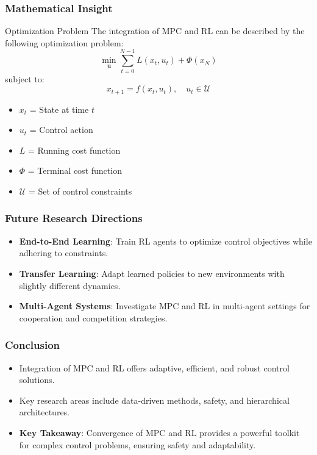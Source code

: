 \documentclass[aspectratio=169]{beamer}
\begin{document}
\begin{frame}[fragile]
    \frametitle{Mathematical Insight}
    \begin{block}{Optimization Problem}
        The integration of MPC and RL can be described by the following optimization problem:
        \begin{equation}
            \min_{\mathbf{u}} \sum_{t=0}^{N-1} L(x_t, u_t) + \Phi(x_N)
        \end{equation}
        subject to:
        \begin{equation}
            x_{t+1} = f(x_t, u_t), \quad u_t \in \mathcal{U}
        \end{equation}
    \end{block}
    \begin{itemize}
        \item \(x_t\) = State at time \(t\)
        \item \(u_t\) = Control action
        \item \(L\) = Running cost function
        \item \(\Phi\) = Terminal cost function
        \item \(\mathcal{U}\) = Set of control constraints
    \end{itemize}
\end{frame}

\begin{frame}[fragile]
    \frametitle{Future Research Directions}
    \begin{itemize}
        \item \textbf{End-to-End Learning}: Train RL agents to optimize control objectives while adhering to constraints.
        \item \textbf{Transfer Learning}: Adapt learned policies to new environments with slightly different dynamics.
        \item \textbf{Multi-Agent Systems}: Investigate MPC and RL in multi-agent settings for cooperation and competition strategies.
    \end{itemize}
\end{frame}

\begin{frame}[fragile]
    \frametitle{Conclusion}
    \begin{itemize}
        \item Integration of MPC and RL offers adaptive, efficient, and robust control solutions.
        \item Key research areas include data-driven methods, safety, and hierarchical architectures.
        \item \textbf{Key Takeaway}: Convergence of MPC and RL provides a powerful toolkit for complex control problems, ensuring safety and adaptability.
    \end{itemize}
\end{frame}
\end{document}
